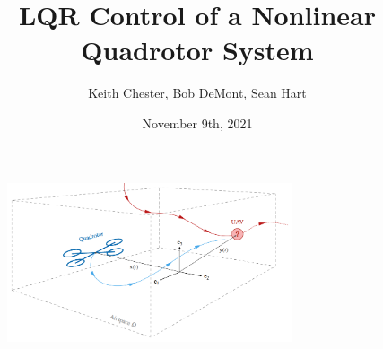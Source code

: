 \documentclass{article}
\title{LQR Control of a Nonlinear Quadrotor System}
\author{Keith Chester, Bob DeMont, Sean Hart}
\date{November 9th, 2021}
\begin{document}
\maketitle

\begin{figure}[h]
    \centering
    \includegraphics[width =0.75\textwidth]{images/ProjProbStmt.png}
    \label{fig:prob}
\end{figure}
\end{document}
